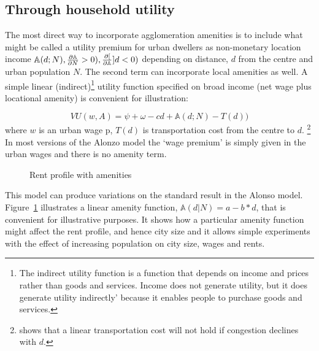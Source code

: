 \subsection{Through household utility}
The most direct way to incorporate agglomeration amenities is  to include what might be called a \gls{utility premium} for urban dwellers as non-monetary location income $\mathbb{A}(d; N), \frac{\partial \mathbb{A}}{\partial N}> 0), \frac{\partial [}{\partial \mathbb{A}}]{d}< 0)$ depending on distance, $d$ from the centre and urban population $N$. The second term can incorporate local amenities as well. A simple linear (indirect)\footnote{The indirect utility function is a function that depends on income and prices rather than goods and services.  Income does not generate utility, but it does generate utility indirectly' because it enables people to purchase goods and services.} utility function specified on broad income (net wage plus locational amenity) is convenient for illustration:

\begin{equation}VU(w,A)= \psi+ \omega-cd + \mathbb{A}(d; N) - T(d))
\label{eqn-u}
\end{equation}
where $w$  is an urban wage p, $T(d)$ is transportation cost from the centre to $d$.
\footnote{\cite{anasUrbanSpatialStructure1998} shows that a linear transportation cost will not  hold if congestion declines  with $d$.} 
 In most versions of the Alonzo model the `wage premium' is simply given in the urban wages and there is no amenity term. 


 
\begin{figure}[t!b]
\begin{center}

\end{center}
\caption{Rent profile with amenities}
\label{fig-amenity}
\end{figure}

 This model can produce variations on the standard result in the Alonso model. Figure~\ref{fig-amenity} illustrates a linear amenity function, $\mathbb{A}(d|N)= a-b*d$, that is convenient for illustrative purposes.  It shows how a particular amenity function might affect the rent profile, and hence city size and it allows simple experiments with the effect of increasing population on city size, wages and rents. 

